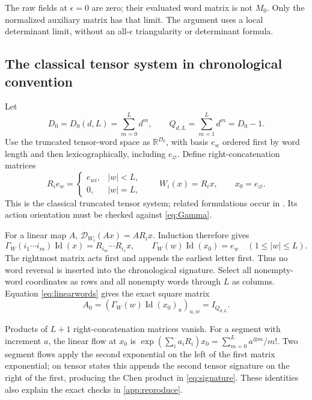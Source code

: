 \documentclass[11pt,a4paper]{article}
\numberwithin{equation}{section}
\theoremstyle{definition}
\theoremstyle{remark}
\DeclareMathOperator{\Id}{Id}
\newcommand{\R}{\mathbb R}
\newcommand{\Dop}{\mathcal D}
\begin{document}
The raw fields at $\epsilon=0$ are zero; their evaluated word matrix is
not $M_0$. Only the normalized auxiliary matrix has that limit. The
argument uses a local determinant limit, without an all-$\epsilon$
triangularity or determinant formula.

\subsection{The classical tensor system in chronological convention}
Let
\begin{equation}\label{eq:D0}
 D_0=D_0(d,L)=\sum_{m=0}^Ld^m,\qquad
 Q_{d,L}=\sum_{m=1}^Ld^m=D_0-1.
\end{equation}
Use the truncated tensor-word space as $\R^{D_0}$, with basis $e_w$
ordered first by word length and then lexicographically, including
$e_{\varnothing}$. Define right-concatenation matrices
\begin{equation}\label{eq:Rconcat}
 R_i e_w=\begin{cases}e_{wi},&|w|<L,\\0,&|w|=L,
 \end{cases}
 \qquad W_i(x)=R_ix,\qquad x_0=e_{\varnothing}.
\end{equation}
This is the classical truncated tensor system; related formulations occur
in \cite{FrizVictoir,AkyildirimAnomaly}. Its action orientation must be
checked against \eqref{eq:Gamma}.

For a linear map $A$, $\Dop_{W_i}(Ax)=AR_ix$. Induction therefore gives
\begin{equation}\label{eq:linearwords}
 \Gamma_W(i_1\cdots i_m)\Id(x)=R_{i_m}\cdots R_{i_1}x,
 \qquad
 \Gamma_W(w)\Id(x_0)=e_w\quad(1\leq|w|\leq L).
\end{equation}
The rightmost matrix acts first and appends the earliest letter first.
Thus no word reversal is inserted into the chronological signature.
Select all nonempty-word coordinates as rows and all nonempty words
through $L$ as columns. Equation \eqref{eq:linearwords} gives the exact
square matrix
\begin{equation}\label{eq:A0}
 A_0=(\Gamma_W(w)\Id(x_0)_u)_{u,w}=I_{Q_{d,L}}.
\end{equation}

Products of $L+1$ right-concatenation matrices vanish. For a segment with
increment $a$, the linear flow at $x_0$ is
$\exp(\sum_i a_iR_i)x_0=\sum_{m=0}^L a^{\otimes m}/m!$.
Two segment flows apply the second exponential on the left of the first
matrix exponential; on tensor states this appends the second tensor
signature on the right of the first, producing the Chen product in
\eqref{eq:signature}. These identities also explain the exact checks in
\cref{app:reproduce}.
\end{document}
